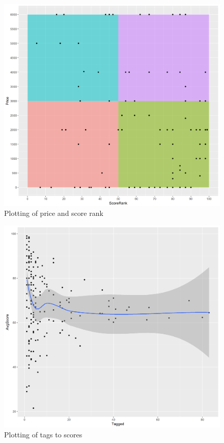 \documentclass[figures_tabs.tex]{subfiles}
\begin{document}
\begin{figure}[H]
    \centering
    \includegraphics[width=\textwidth]{img/score_price.png}
    \caption{Plotting of price and score rank}
    \label{fig:score_price}
\end{figure}

\begin{figure}[H]
    \centering
    \includegraphics[width=\textwidth]{img/tag_score.png}
    \caption{Plotting of tags to scores}
    \label{fig:tag_score}
\end{figure}
\end{document}
